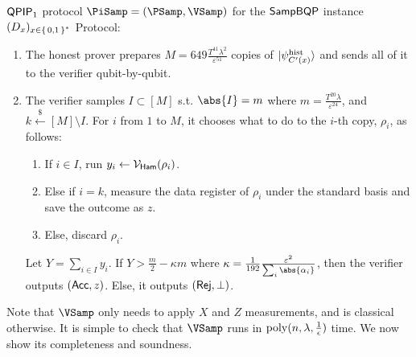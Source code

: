 \begin{protocol}{$\operatorname{\mathsf{QPIP}}_1$ protocol $\PiSamp=(\PSamp, \VSamp)$ for the $\operatorname{\mathsf{SampBQP}}$ instance $(D_x)_{x\in\set{0, 1}^*}$}
	Protocol:
	\begin{enumerate}
		\item\label{step:qpip1-state-gen} The honest prover prepares $M=649\frac{T^{41}\lambda^2}{\varepsilon^{51}}$ copies  of $\ket{\psi_{C'(x)}^{\mathrm{hist}}}$ and sends all of it to the verifier qubit-by-qubit.
		\item\label{step:qpip1-verify} The verifier samples $I\subset[M]$ s.t. $\abs{I}=m$ where $m=\frac{T^{20}\lambda}{\varepsilon^{24}}$, and $k\xleftarrow{\$}[M]\setminus I$.
			For $i$ from $1$ to $M$, it chooses what to do to the $i$-th copy, $\rho_i$, as follows:
		\begin{enumerate}
			\item If $i\in I$, run $y_i\leftarrow\mathcal{V}_{\mathsf{Ham}}(\rho_i)$.
			\item Else if $i=k$, measure the data register    of $\rho_i$ under the standard basis and save the outcome as $z$.
			\item Else, discard $\rho_i$.
		\end{enumerate}
			Let $Y=\sum_{i\in I} y_i$. If $Y>\frac{m}{2}-\kappa m$ where $\kappa=\frac{1}{192}\frac{\varepsilon^2}{\sum_i\abs{\alpha_i}}$, then the verifier outputs $(\mathsf{Acc}, z)$.
			Else, it outputs $(\mathsf{Rej}, \bot)$.
	\end{enumerate}
\end{protocol}

Note that $\VSamp$ only needs to apply $X$ and $Z$ measurements, and is classical otherwise.
It is simple to check that $\VSamp$ runs in $\operatorname*{\operatorname{poly}}(n, \lambda, \frac{1}{\epsilon})$ time.
We now show its completeness and soundness.
  
